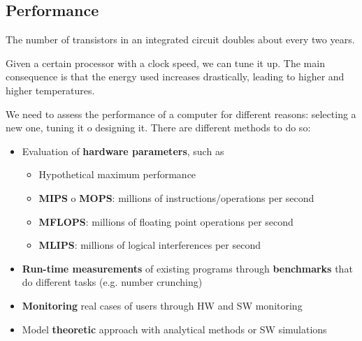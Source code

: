 \subsection{Performance}
\begin{definition}
	The number of transistors in an integrated circuit doubles about every two years. 
\end{definition}

\begin{observation}[Overclocking]
	Given a certain processor with a clock speed, we can tune it up. The main consequence is that the energy used increases drastically, leading to higher and higher temperatures.
\end{observation}

We need to assess the performance of a computer for different reasons: selecting a new one, tuning it o designing it. There are different methods to do so:
\begin{itemize}
	\item Evaluation of \textbf{hardware parameters}, such as
	\begin{itemize}
		\item Hypothetical maximum performance
		\item \textbf{MIPS} o \textbf{MOPS}: millions of instructions/operations per second
		\item \textbf{MFLOPS}: millions of floating point operations per second
		\item \textbf{MLIPS}: millions of logical interferences per second
	\end{itemize}
	\item \textbf{Run-time measurements} of existing programs through \textbf{benchmarks} that do different tasks (e.g. number crunching)
	\item \textbf{Monitoring} real cases of users through HW and SW monitoring
	\item Model \textbf{theoretic} approach with analytical methods or SW simulations
\end{itemize}

